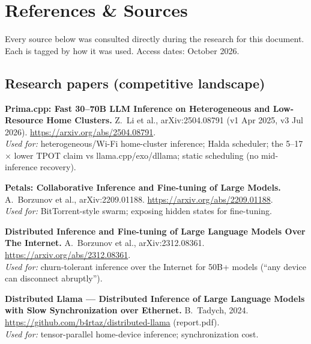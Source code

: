 \section{References \& Sources}
\label{sec:references}

Every source below was consulted directly during the research for this document.
Each is tagged by how it was used. Access dates: October 2026.

\sloppy

\subsection{Research papers (competitive landscape)}
\begin{enumerate}[leftmargin=1.8em,label={[P\arabic*]}]
  \item \textbf{Prima.cpp: Fast 30--70B LLM Inference on Heterogeneous and
  Low-Resource Home Clusters.} Z.~Li et al., arXiv:2504.08791 (v1 Apr 2025, v3
  Jul 2026). \url{https://arxiv.org/abs/2504.08791}. \\
  \emph{Used for:} heterogeneous/Wi-Fi home-cluster inference; Halda scheduler;
  the 5--17$\times$ lower TPOT claim vs llama.cpp/exo/dllama; static scheduling
  (no mid-inference recovery). \VER

  \item \textbf{Petals: Collaborative Inference and Fine-tuning of Large Models.}
  A.~Borzunov et al., arXiv:2209.01188. \url{https://arxiv.org/abs/2209.01188}. \\
  \emph{Used for:} BitTorrent-style swarm; exposing hidden states for fine-tuning. \VER

  \item \textbf{Distributed Inference and Fine-tuning of Large Language Models
  Over The Internet.} A.~Borzunov et al., arXiv:2312.08361. \\
  \url{https://arxiv.org/abs/2312.08361}. \\
  \emph{Used for:} churn-tolerant inference over the Internet for 50B+ models
  (``any device can disconnect abruptly''). \VER

  \item \textbf{Distributed Llama --- Distributed Inference of Large Language
  Models with Slow Synchronization over Ethernet.} B.~Tadych, 2024. \\
  \url{https://github.com/b4rtaz/distributed-llama} (report.pdf). \\
  \emph{Used for:} tensor-parallel home-device inference; synchronization cost. \VER


\end{enumerate}
